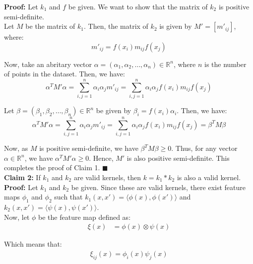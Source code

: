\documentclass[a4paper]{article}
\begin{document}
\textbf{Proof:} Let $k_1$ and $f$ be given. We want to show that the matrix of $k_2$ is positive semi-definite.\\

Let $M$ be the matrix of $k_1$. Then, the matrix of $k_2$ is given by $M' = [m'_{ij}]$, where:
\begin{equation*}
    m'_{ij} = f(x_i)m_{ij}f(x_j)
\end{equation*}

Now, take an abritary vector $\alpha = (\alpha_1, \alpha_2, \ldots, \alpha_n) \in \mathbb{R}^n$, where $n$ is the number of points in the dataset. Then, we have:
\begin{equation*}
    \alpha^T M' \alpha = \sum_{i,j=1}^n \alpha_i \alpha_j m'_{ij} = \sum_{i,j=1}^n \alpha_i \alpha_j f(x_i)m_{ij}f(x_j)
\end{equation*}

Let $\beta = (\beta_1, \beta_2, \ldots, \beta_n) \in \mathbb{R}^n$ be given by $\beta_i = f(x_i) \alpha_i$. Then, we have:
\begin{equation*}
    \alpha^T M' \alpha = \sum_{i,j=1}^n \alpha_i \alpha_j m'_{ij} = \sum_{i,j=1}^n \alpha_i \alpha_j f(x_i)m_{ij}f(x_j) = \beta^T M \beta
\end{equation*}

Now, as $M$ is positive semi-definite, we have $\beta^T M \beta \geq 0$. Thus, for any vector $\alpha \in \mathbb{R}^n$, we have $\alpha^T M' \alpha \geq 0$. Hence, $M'$ is also positive semi-definite. This completes the proof of Claim 1. $\blacksquare$\\


\textbf{Claim 2:} If $k_1$ and $k_2$ are valid kernels, then $k = k_1 * k_2$ is also a valid kernel.\\

\textbf{Proof:} Let $k_1$ and $k_2$ be given. Since these are valid kernels, there exist feature maps $\phi_1$ and $\phi_2$ such that $k_1(x, x') = \langle \phi(x), \phi(x') \rangle$ and $k_2(x, x') = \langle \psi(x), \psi(x') \rangle$.\\

Now, let $\phi$ be the feature map defined as:
\begin{align*}
    \xi(x) &= \phi(x) \otimes \psi(x)
\end{align*}

Which means that:
\begin{align*}
    \xi_{ij}(x) = \phi_i(x) \psi_j(x)
\end{align*}
\end{document}

